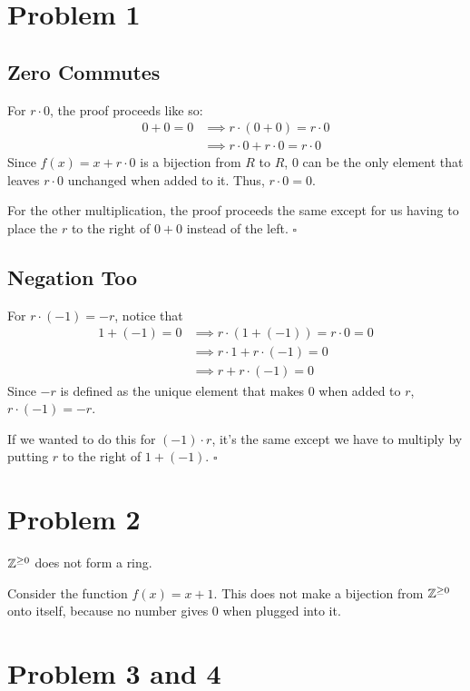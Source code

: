 \documentclass[12pt]{article}
\begin{document}
\section{Problem 1}

\subsection{Zero Commutes}

For $r \cdot 0$, the proof proceeds like so:
\begin{align*}
  0 + 0 = 0
   & \implies r \cdot (0 + 0) = r \cdot 0       \\
   & \implies r \cdot 0 + r \cdot 0 = r \cdot 0
\end{align*}
Since $f(x)=x+r \cdot 0$ is a bijection from $R$ to $R$,
$0$ can be the only element that leaves $r \cdot 0$ unchanged when
added to it.
Thus, $r \cdot 0 = 0$.

For the other multiplication, the proof proceeds the same except for us
having to place the $r$ to the right of $0+0$ instead of the left. $\square$

\subsection{Negation Too}

For $r \cdot (-1) = -r$, notice that
\begin{align*}
  1+(-1)=0
   & \implies r \cdot (1+(-1))=r \cdot 0=0 \\
   & \implies r \cdot 1 + r \cdot (-1) = 0 \\
   & \implies r + r \cdot (-1) = 0
\end{align*}
Since $-r$ is defined as the unique element that makes $0$ when added to $r$, $r \cdot (-1) = -r$.


If we wanted to do this for $(-1) \cdot r$, it's the same except we have to
multiply by putting $r$ to the right of $1+(-1)$. $\square$

\section{Problem 2}

$\mathbb{Z}^{\ge 0}$ does not form a ring.

Consider the function $f(x)=x+1$.
This does not make a bijection from $\mathbb{Z}^{\ge 0}$ onto itself, because
no number gives $0$ when plugged into it.

\pagebreak

\section{Problem 3 and 4}
\end{document}
